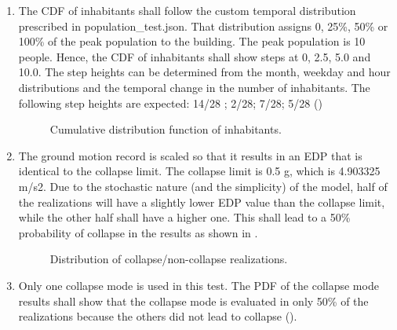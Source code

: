 \begin{enumerate}
    \item The CDF of inhabitants shall follow the custom temporal distribution prescribed in population\_test.json. That distribution assigns 0, 25\%, 50\% or 100\% of the peak population to the building. The peak population is 10 people. Hence, the CDF of inhabitants shall show steps at 0, 2.5, 5.0 and 10.0. The step heights can be determined from the month, weekday and hour distributions and the temporal change in the number of inhabitants. The following step heights are expected: 14/28 ; 2/28; 7/28; 5/28 ()

\begin{figure}[!htbp]
  \caption{Cumulative distribution function of inhabitants.}
  \label{fig:ver_1_4}
\end{figure}

    \item The ground motion record is scaled so that it results in an EDP that is identical to the collapse limit. The collapse limit is 0.5 g, which is 4.903325 m/s2. Due to the stochastic nature (and the simplicity) of the model, half of the realizations will have a slightly lower EDP value than the collapse limit, while the other half shall have a higher one. This shall lead to a 50\% probability of collapse in the results as shown in .
    
\begin{figure}[!htbp]
  \caption{Distribution of collapse/non-collapse realizations.}
  \label{fig:ver_1_5}
\end{figure}

    \item Only one collapse mode is used in this test. The PDF of the collapse mode results shall show that the collapse mode is evaluated in only 50\% of the realizations because the others did not lead to collapse ().
    

\end{enumerate}
